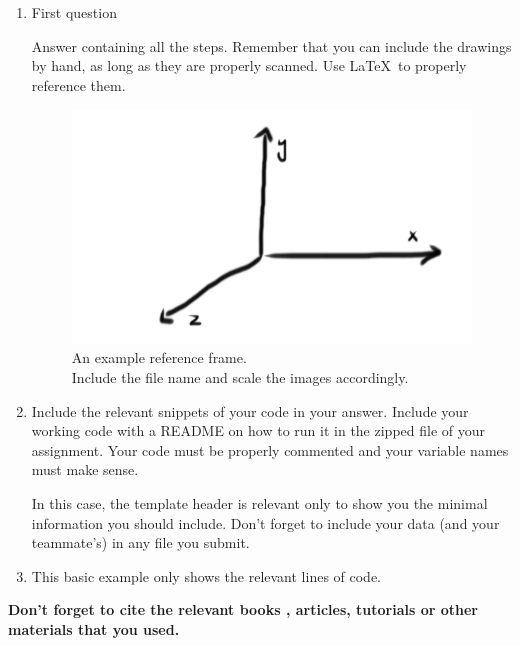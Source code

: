 \documentclass[paper=a4, fontsize=11pt]{scrartcl}
\begin{document}
\begin{enumerate}
	\item First question
	
	Answer containing all the steps. Remember that you can include the drawings by hand, as long as they are properly scanned. Use \LaTeX ~to properly reference them. 
	\begin{figure}[h]
		\label{fig:frame}
		\begin{center}
			\caption{An example reference frame. \\ Include the file name and scale the images accordingly.}
			\includegraphics[width=.3\textwidth]{images/Frame}
		\end{center}	
	\end{figure}
	
	\item Include the relevant snippets of your code in your answer. 
	Include your working code with a README on how to run it in the zipped file of your assignment. Your code must be properly commented and your variable names must make sense.
	 
	In this case, the template header is relevant only to show you the minimal information you should include. Don't forget to include your data (and your teammate's) in any file you submit.
	
	
	\item This basic example only shows the relevant lines of code.
	

\end{enumerate}

\textbf{\Large Don't forget to cite the relevant books \cite{craig2005}, articles, tutorials or other materials that you used.}



\end{document}
